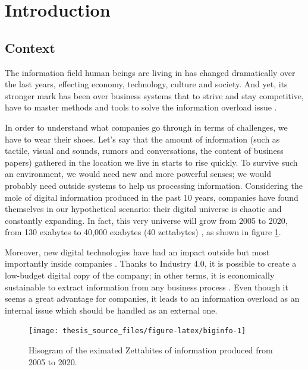 \documentclass[]{book}
\title{}
\author{}
\date{}
\theoremstyle{definition}
\theoremstyle{definition}
\theoremstyle{definition}
\theoremstyle{remark}
\begin{document}
{
\setcounter{tocdepth}{1}
\tableofcontents
}
\part{Introduction}\label{part-introduction}

\chapter*{Context}\label{context}

The information field human beings are living in has changed
dramatically over the last years, effecting economy, technology, culture
and society. And yet, its stronger mark has been over business systems
\citep{Arun2006Firm, jin2015significance, degryse2016digitalisation, john2014big, o2016weapons}
that to strive and stay competitive, have to master methods and tools to
solve the information overload issue
\citep{levitin2014organized, feng2015competing}.

In order to understand what companies go through in terms of challenges,
we have to wear their shoes. Let's say that the amount of information
(such as tactile, visual and sounds, rumors and conversations, the
content of business papers) gathered in the location we live in starts
to rise quickly. To survive such an environment, we would need new and
more powerful senses; we would probably need outside systems to help us
processing information. Considering the mole of digital information
produced in the past 10 years, companies have found themselves in our
hypothetical scenario: their digital universe is chaotic and constantly
expanding. In fact, this very universe will grow from 2005 to 2020, from
130 exabytes to 40,000 exabytes (40 zettabytes)
\citep{gantz2012digital}, as shown in figure \ref{fig:biginfo}.

Moreover, new digital technologies have had an impact outside but most
importantly inside companies
\citep{lasi2014industry, brettel2014virtualization, russmann2015industry}.
Thanks to Industry 4.0, it is possible to create a low-budget digital
copy of the company; in other terms, it is economically sustainable to
extract information from any business process
\citep{davies2015industry}. Even though it seems a great advantage for
companies, it leads to an information overload as an internal issue
which should be handled as an external one.

\begin{figure}

{\centering \texttt{[image: thesis\_source\_files/figure-latex/biginfo-1]} 

}

\caption{Hisogram of the eximated Zettabites of information produced from 2005 to 2020.}\label{fig:biginfo}
\end{figure}
\end{document}
